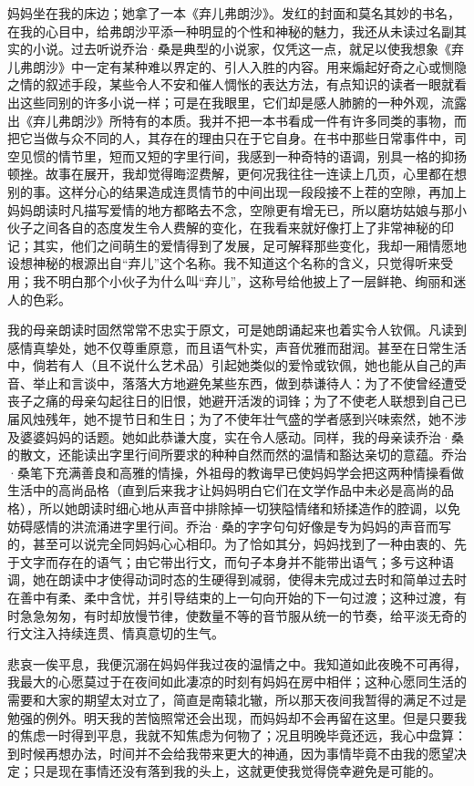 \par 妈妈坐在我的床边；她拿了一本《弃儿弗朗沙》。发红的封面和莫名其妙的书名，在我的心目中，给弗朗沙平添一种明显的个性和神秘的魅力，我还从未读过名副其实的小说。过去听说乔治·桑是典型的小说家，仅凭这一点，就足以使我想象《弃儿弗朗沙》中一定有某种难以界定的、引人入胜的内容。用来煽起好奇之心或恻隐之情的叙述手段，某些令人不安和催人惆怅的表达方法，有点知识的读者一眼就看出这些同别的许多小说一样；可是在我眼里，它们却是感人肺腑的一种外观，流露出《弃儿弗朗沙》所特有的本质。我并不把一本书看成一件有许多同类的事物，而把它当做与众不同的人，其存在的理由只在于它自身。在书中那些日常事件中，司空见惯的情节里，短而又短的字里行间，我感到一种奇特的语调，别具一格的抑扬顿挫。故事在展开，我却觉得晦涩费解，更何况我往往一连读上几页，心里都在想别的事。这样分心的结果造成连贯情节的中间出现一段段接不上茬的空隙，再加上妈妈朗读时凡描写爱情的地方都略去不念，空隙更有增无已，所以磨坊姑娘与那小伙子之间各自的态度发生令人费解的变化，在我看来就好像打上了非常神秘的印记；其实，他们之间萌生的爱情得到了发展，足可解释那些变化，我却一厢情愿地设想神秘的根源出自“弃儿”这个名称。我不知道这个名称的含义，只觉得听来受用；我不明白那个小伙子为什么叫“弃儿”，这称号给他披上了一层鲜艳、绚丽和迷人的色彩。
\par 我的母亲朗读时固然常常不忠实于原文，可是她朗诵起来也着实令人钦佩。凡读到感情真挚处，她不仅尊重原意，而且语气朴实，声音优雅而甜润。甚至在日常生活中，倘若有人（且不说什么艺术品）引起她类似的爱怜或钦佩，她也能从自己的声音、举止和言谈中，落落大方地避免某些东西，做到恭谦待人：为了不使曾经遭受丧子之痛的母亲勾起往日的旧恨，她避开活泼的词锋；为了不使老人联想到自己已届风烛残年，她不提节日和生日；为了不使年壮气盛的学者感到兴味索然，她不涉及婆婆妈妈的话题。她如此恭谦大度，实在令人感动。同样，我的母亲读乔治·桑的散文，还能读出字里行间所要求的种种自然而然的温情和豁达亲切的意蕴。乔治·桑笔下充满善良和高雅的情操，外祖母的教诲早已使妈妈学会把这两种情操看做生活中的高尚品格（直到后来我才让妈妈明白它们在文学作品中未必是高尚的品格），所以她朗读时细心地从声音中排除掉一切狭隘情绪和矫揉造作的腔调，以免妨碍感情的洪流涌进字里行间。乔治·桑的字字句句好像是专为妈妈的声音而写的，甚至可以说完全同妈妈心心相印。为了恰如其分，妈妈找到了一种由衷的、先于文字而存在的语气；由它带出行文，而句子本身并不能带出语气；多亏这种语调，她在朗读中才使得动词时态的生硬得到减弱，使得未完成过去时和简单过去时在善中有柔、柔中含忧，并引导结束的上一句向开始的下一句过渡；这种过渡，有时急急匆匆，有时却放慢节律，使数量不等的音节服从统一的节奏，给平淡无奇的行文注入持续连贯、情真意切的生气。
\par 悲哀一俟平息，我便沉溺在妈妈伴我过夜的温情之中。我知道如此夜晚不可再得，我最大的心愿莫过于在夜间如此凄凉的时刻有妈妈在房中相伴；这种心愿同生活的需要和大家的期望太对立了，简直是南辕北辙，所以那天夜间我暂得的满足不过是勉强的例外。明天我的苦恼照常还会出现，而妈妈却不会再留在这里。但是只要我的焦虑一时得到平息，我就不知焦虑为何物了；况且明晚毕竟还远，我心中盘算：到时候再想办法，时间并不会给我带来更大的神通，因为事情毕竟不由我的愿望决定；只是现在事情还没有落到我的头上，这就更使我觉得侥幸避免是可能的。
